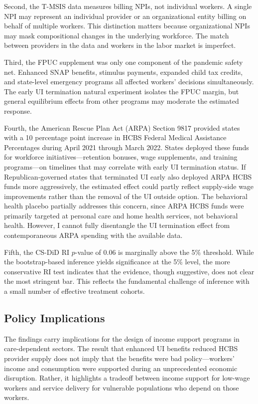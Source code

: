 \documentclass[12pt]{article}
\begin{document}
Second, the T-MSIS data measures billing NPIs, not individual workers. A single NPI may represent an individual provider or an organizational entity billing on behalf of multiple workers. This distinction matters because organizational NPIs may mask compositional changes in the underlying workforce. The match between providers in the data and workers in the labor market is imperfect.

Third, the FPUC supplement was only one component of the pandemic safety net. Enhanced SNAP benefits, stimulus payments, expanded child tax credits, and state-level emergency programs all affected workers' decisions simultaneously. The early UI termination natural experiment isolates the FPUC margin, but general equilibrium effects from other programs may moderate the estimated response.

Fourth, the American Rescue Plan Act (ARPA) Section 9817 provided states with a 10 percentage point increase in HCBS Federal Medical Assistance Percentages during April 2021 through March 2022. States deployed these funds for workforce initiatives---retention bonuses, wage supplements, and training programs---on timelines that may correlate with early UI termination status. If Republican-governed states that terminated UI early also deployed ARPA HCBS funds more aggressively, the estimated effect could partly reflect supply-side wage improvements rather than the removal of the UI outside option. The behavioral health placebo partially addresses this concern, since ARPA HCBS funds were primarily targeted at personal care and home health services, not behavioral health. However, I cannot fully disentangle the UI termination effect from contemporaneous ARPA spending with the available data.

Fifth, the CS-DiD RI $p$-value of 0.06 is marginally above the 5\% threshold. While the bootstrap-based inference yields significance at the 5\% level, the more conservative RI test indicates that the evidence, though suggestive, does not clear the most stringent bar. This reflects the fundamental challenge of inference with a small number of effective treatment cohorts.

\subsection{Policy Implications}

The findings carry implications for the design of income support programs in care-dependent sectors. The result that enhanced UI benefits reduced HCBS provider supply does not imply that the benefits were bad policy---workers' income and consumption were supported during an unprecedented economic disruption. Rather, it highlights a tradeoff between income support for low-wage workers and service delivery for vulnerable populations who depend on those workers.
\end{document}
